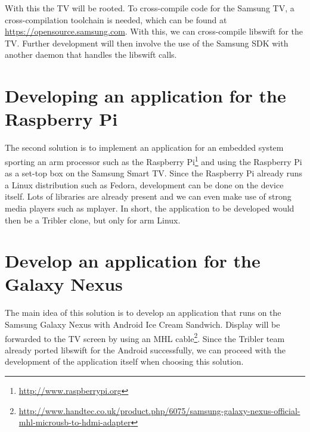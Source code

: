 With this the TV will be rooted. To cross-compile code for the Samsung TV, 
a cross-compilation toolchain is needed, which can be found at \url{https://opensource.samsung.com}.
With this, we can cross-compile libswift for the TV. Further development will then involve the use of the Samsung SDK with another daemon that handles the libswift calls.

\section{Developing an application for the Raspberry Pi}
The second solution is to implement an application for an embedded system sporting an arm processor such as the Raspberry Pi\footnote{\url{http://www.raspberrypi.org}}
and using the Raspberry Pi as a set-top box on the Samsung Smart TV.
Since the Raspberry Pi already runs a Linux distribution such as Fedora, development can be done on the device itself.
Lots of libraries are already present and we can even make use of strong media players such as mplayer.
In short, the application to be developed would then be a Tribler clone, but only for arm Linux.

\section{Develop an application for the Galaxy Nexus}
The main idea of this solution is to develop an application that runs on the Samsung Galaxy Nexus with Android Ice Cream Sandwich.
Display will be forwarded to the TV screen by using an MHL cable\footnote{\url{http://www.handtec.co.uk/product.php/6075/samsung-galaxy-nexus-official-mhl-microusb-to-hdmi-adapter}}.
Since the Tribler team already ported libswift for the Android successfully,
we can proceed with the development of the application itself when choosing this solution.
